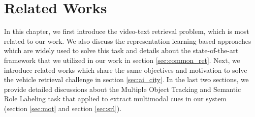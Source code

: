 \chapter{Related Works}
\label{chap-related-works}
\begin{ChapAbstract}
In this chapter, we first introduce the video-text retrieval problem, which is most related to our work. We also discuss the representation learning based approaches which are widely used to solve this task and details about the state-of-the-art framework that we utilized in our work in section \ref{sec:common_ret}. 
Next, we introduce related works which share the same objectives and motivation to solve the vehicle retrieval challenge in section \ref{sec:ai_city}.
In the last two sections, we provide detailed discussions about the Multiple Object Tracking and Semantic Role Labeling task that applied to extract multimodal cues in our system (section \ref{sec:mot} and section \ref{sec:srl}).
\end{ChapAbstract}




